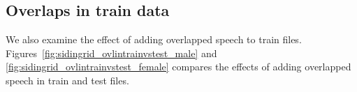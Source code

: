 %
%	

\subsection{Overlaps in train data}
We also examine the effect of adding overlapped speech to train files.
Figures~\ref{fig:sidingrid_ovlintrainvstest_male} and \ref{fig:sidingrid_ovlintrainvstest_female} compares the effects of adding overlapped speech in train and test files.

